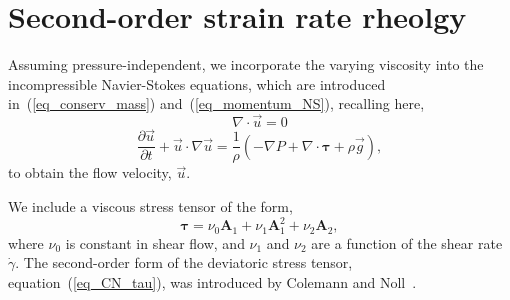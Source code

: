 \section{Second-order strain rate rheolgy}
Assuming pressure-independent, we incorporate the varying viscosity into the incompressible Navier-Stokes equations, which are introduced in~(\ref{eq_conserv_mass}) and~(\ref{eq_momentum_NS}), recalling here,
\begin{equation*}
  \nabla \cdot \vec{u} = 0 
  \nonumber
\end{equation*}
\begin{equation*}
  \frac{\partial \vec{u}}{\partial t} + \vec{u}\cdot \nabla \vec{u}
  = \frac{1}{\rho}
  \left(
  - \nabla P 
      + \nabla \cdot   \bm{\tau} 
      +  \rho  \vec{g} 
      \right),
      \nonumber
\end{equation*}
to obtain the flow velocity, $\vec{u}$.

We include a viscous stress tensor of the form,
\begin{equation}
   \boldsymbol{\tau} = 
    \nu_0  \bm{A}_1 +  \nu_1  \bm{A}_1^2 + \nu_2 \bm{A}_2,
   \label{eq_CN_tau}
\end{equation}
where $\nu_0$ is constant in shear flow, and $\nu_1$ and $\nu_2$ are a function of the shear rate $\dot{\gamma}$.
The second-order form of the deviatoric stress tensor, equation~(\ref{eq_CN_tau}), was introduced by Colemann and Noll~\cite{coleman_approximation_1960}.
